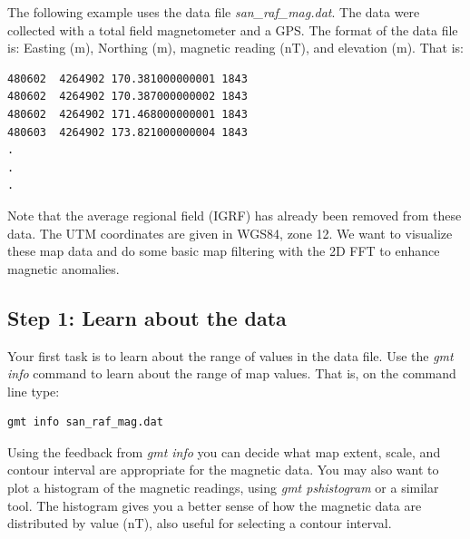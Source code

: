 \documentclass[letterpaper,10pt]{report}
\begin{document}
The following example uses the data file {\it san\_raf\_mag.dat}. The data were collected with a total field magnetometer and a GPS. The format of the data file is: Easting (m), Northing (m), magnetic reading (nT), and elevation (m). That is:

\begin{verbatim}
480602	4264902 170.381000000001 1843
480602	4264902 170.387000000002 1843
480602	4264902 171.468000000001 1843
480603	4264902 173.821000000004 1843
.
.
.
\end{verbatim}
Note that the average regional field (IGRF) has already been removed from these data. The UTM coordinates are given in WGS84, zone 12. We want to visualize these map data and do some basic map filtering with the 2D FFT to enhance magnetic anomalies.

\subsection*{Step 1: Learn about the data}
Your first task is to learn about the range of values in the data file. Use the {\it gmt info} command to learn about the range of map values. That is, on the command line type:
\begin{verbatim}
gmt info san_raf_mag.dat
\end{verbatim}
Using the feedback from {\it gmt info} you can decide what map extent, scale, and contour interval are appropriate for the magnetic data. You may also want to plot a histogram of the magnetic readings, using {\it gmt pshistogram} or a similar tool. The histogram gives you a better sense of how the magnetic data are distributed by value (nT), also useful for selecting a contour interval.
\end{document}

